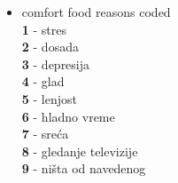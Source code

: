 \documentclass[12pt,a4paper]{article}
\begin{document}
\begin{itemize}
  \item comfort food reasons coded\\
   \textbf{1} - stres\\
   \textbf{2} - dosada\\
   \textbf{3} - depresija\\
   \textbf{4} - glad\\
   \textbf{5} - lenjost\\
   \textbf{6} - hladno vreme \\
   \textbf{7} - sre\'  ca\\ 
   \textbf{8} - gledanje televizije\\
   \textbf{9} - ni\v sta od navedenog 
\end{itemize}









	













\end{document}
